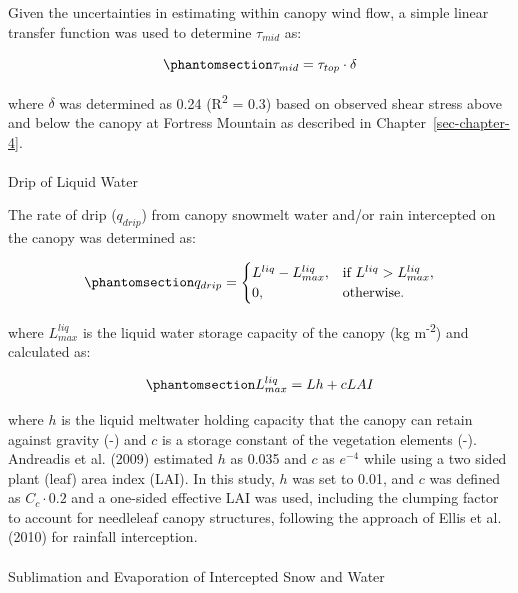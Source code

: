 \documentclass[
  letterpaper,
]{tex/uofsthesis-cs}
\makeatletter
\let\oldparagraph\paragraph
\renewcommand{\paragraph}{
    \@ifstar
      \xxxParagraphStar
      \xxxParagraphNoStar
  }
\newcommand{\xxxParagraphStar}[1]{\oldparagraph*{#1}\mbox{}}
\newcommand{\xxxParagraphNoStar}[1]{\oldparagraph{#1}\mbox{}}
\makeatother
\begin{document}
Given the uncertainties in estimating within canopy wind flow, a simple
linear transfer function was used to determine \(\tau_{mid}\) as:

\begin{equation}\phantomsection\label{eq-tau-tau}{
\tau_{mid} = \tau_{top} \cdot \delta  
}\end{equation}

where \(\delta\) was determined as 0.24 (R\textsuperscript{2} = 0.3)
based on observed shear stress above and below the canopy at Fortress
Mountain as described in Chapter~\ref{sec-chapter-4}.

\paragraph{Drip of Liquid Water}\label{drip-of-liquid-water}

The rate of drip (\(q_{drip}\)) from canopy snowmelt water and/or rain
intercepted on the canopy was determined as:

\begin{equation}\phantomsection\label{eq-drip-05}{
q_{drip} = \begin{cases}
    L^{liq} - L_{max}^{liq}, & \text{if } L^{liq}> L_{max}^{liq},\\
    0 ,              & \text{otherwise.}
\end{cases}
}\end{equation}

where \(L_{max}^{liq}\) is the liquid water storage capacity of the
canopy (kg m\textsuperscript{-2}) and calculated as:

\begin{equation}\phantomsection\label{eq-liq-hold-cap-05}{
L_{max}^{liq} = Lh + cLAI
}\end{equation}

where \(h\) is the liquid meltwater holding capacity that the canopy can
retain against gravity (-) and \(c\) is a storage constant of the
vegetation elements (-). Andreadis et al. (2009) estimated \(h\) as
0.035 and \(c\) as \(e^{-4}\) while using a two sided plant (leaf) area
index (LAI). In this study, \(h\) was set to 0.01, and \(c\) was defined
as \(C_c \cdot 0.2\) and a one-sided effective LAI was used, including
the clumping factor to account for needleleaf canopy structures,
following the approach of Ellis et al. (2010) for rainfall interception.

\paragraph{Sublimation and Evaporation of Intercepted Snow and
Water}\label{sublimation-and-evaporation-of-intercepted-snow-and-water}
\end{document}
